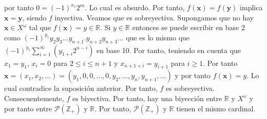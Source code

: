 \documentclass{article}
\newcommand{\vect}[1]{\boldsymbol{#1}}
\begin{document}
por tanto $0=(-1)^{x_1}2^m$. Lo cual es absurdo. Por tanto, $f(\vect{x})=f(\vect{y})$ implica  $\vect{x}=\vect{y}$, siendo $f$ inyectiva. Veamos que es sobreyectiva. Supongamos que no hay $\vect{x}\in X^{\omega}$ tal que $f(\vect{x})=y\in \mathbb{R}$. Si $y\in \mathbb{R}$ entonces se puede escribir en base 2 como $(-1)^{y_1}y_2y_3...y_{n+1}.y_{n+2}y_{n+3}...$ que es lo mismo que $(-1)^{y_1}\sum_{i=1}^{\infty}\left(y_{1+i}2^{n-i}\right)$ en base 10. Por tanto, teniendo en cuenta que $x_1=y_1$, $x_i=0$ para $2\leq i \leq n+1$ y $x_{n+1+i}=y_{i+1}$ para $i\geq 1$. Por tanto $\vect{x}=(x_1,x_2,...)=(y_1,0,0,...,0,y_2,...,y_n,y_{n+1},...)$ y por tanto $f(\vect{x})=y$. Lo cual contradice la suposición anterior. Por tanto, $f$ es sobreyectiva. Consecuentemente,  $f$ es biyectiva. Por tanto, hay una biyección entre $\mathbb{R}$ y $X^{\omega}$ y por tanto entre $\mathcal{P}(\mathbb{Z}_+)$ y $\mathbb{R}$. Por tanto, $\mathcal{P}(\mathbb{Z}_+)$ y $\mathbb{R}$ tienen el mismo cardinal.



  
\end{document}
